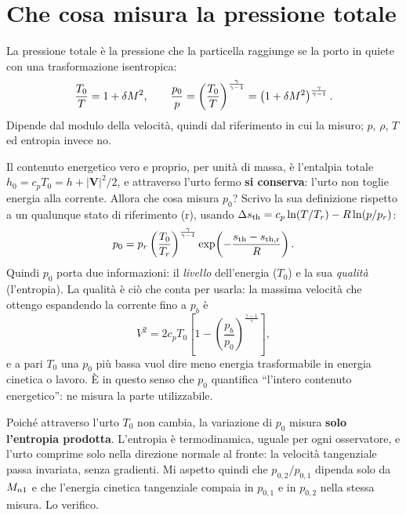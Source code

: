 \section*{Che cosa misura la pressione totale}
La pressione totale è la pressione che la particella raggiunge se la porto in quiete con una trasformazione
isentropica:
\begin{gather*}
  \frac{T_0}{T}=1+\delta M^2 ,\qquad \frac{p_0}{p}=\left(\frac{T_0}{T}\right)^{\frac{\gamma}{\gamma-1}}=\left(1+\delta M^2\right)^{\frac{\gamma}{\gamma-1}}.
\end{gather*}
Dipende dal modulo della velocità, quindi dal riferimento in cui la misuro; $p$, $\rho$, $T$ ed entropia invece no.

Il contenuto energetico vero e proprio, per unità di massa, è l'entalpia totale $h_0=c_pT_0=h+|\boldsymbol V|^2/2$,
e attraverso l'urto fermo \textbf{si conserva}: l'urto non toglie energia alla corrente. Allora che cosa misura
$p_0$? Scrivo la sua definizione rispetto a un qualunque stato di riferimento (r), usando
$\Delta s_{\rm th}=c_p\ln(T/T_r)-R\ln(p/p_r)$:
\[
  p_0=p_r\left(\frac{T_0}{T_r}\right)^{\frac{\gamma}{\gamma-1}}\exp\!\left(-\frac{s_{\rm th}-s_{\rm th,r}}{R}\right).
\]
Quindi $p_0$ porta due informazioni: il \emph{livello} dell'energia ($T_0$) e la sua \emph{qualità} (l'entropia). La
qualità è ciò che conta per usarla: la massima velocità che ottengo espandendo la corrente fino a $p_b$ è
\[
  V^2=2c_pT_0\left[1-\left(\frac{p_b}{p_0}\right)^{\frac{\gamma-1}{\gamma}}\right],
\]
e a pari $T_0$ una $p_0$ più bassa vuol dire meno energia trasformabile in energia cinetica o lavoro. È in questo
senso che $p_0$ quantifica ``l'intero contenuto energetico'': ne misura la parte utilizzabile.

Poiché attraverso l'urto $T_0$ non cambia, la variazione di $p_0$ misura \textbf{solo l'entropia prodotta}.
L'entropia è termodinamica, uguale per ogni osservatore, e l'urto comprime solo nella direzione normale al fronte:
la velocità tangenziale passa invariata, senza gradienti. Mi aspetto quindi che $p_{0,2}/p_{0,1}$ dipenda solo da
$M_{n1}$ e che l'energia cinetica tangenziale compaia in $p_{0,1}$ e in $p_{0,2}$ nella stessa misura. Lo verifico.

